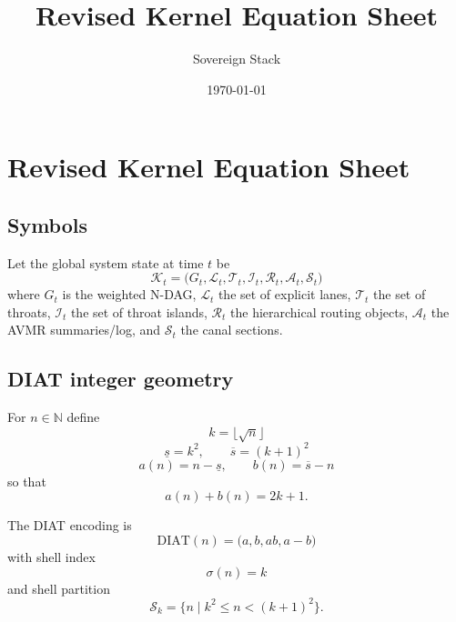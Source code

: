 \documentclass[11pt,a4paper]{article}
\title{Revised Kernel Equation Sheet}
\author{Sovereign Stack}
\date{\today}
\begin{document}
\maketitle

\appendix
\section{Revised Kernel Equation Sheet}

\subsection{Symbols}

Let the global system state at time $t$ be
\begin{equation}
\mathcal{K}_t = \bigl(G_t,\mathcal{L}_t,\mathcal{T}_t,\mathcal{I}_t,\mathcal{R}_t,\mathcal{A}_t,\mathcal{S}_t\bigr)
\label{eq:global_state}
\end{equation}
where $G_t$ is the weighted N-DAG, $\mathcal{L}_t$ the set of explicit lanes, $\mathcal{T}_t$ the set of throats, $\mathcal{I}_t$ the set of throat islands, $\mathcal{R}_t$ the hierarchical routing objects, $\mathcal{A}_t$ the AVMR summaries/log, and $\mathcal{S}_t$ the canal sections.

\subsection{DIAT integer geometry}

For $n\in\mathbb{N}$ define
\begin{equation}
k = \lfloor \sqrt{n} \rfloor
\label{eq:k_floor}
\end{equation}
\begin{equation}
\underline{s} = k^2,
\qquad
\overline{s} = (k+1)^2
\label{eq:squares}
\end{equation}
\begin{equation}
a(n)=n-\underline{s},
\qquad
b(n)=\overline{s}-n
\label{eq:a_b}
\end{equation}
so that
\begin{equation}
a(n)+b(n)=2k+1.
\label{eq:a_plus_b}
\end{equation}

The DIAT encoding is
\begin{equation}
\mathrm{DIAT}(n)=\bigl(a,b,ab,a-b\bigr)
\label{eq:diat}
\end{equation}
with shell index
\begin{equation}
\sigma(n)=k
\label{eq:shell_index}
\end{equation}
and shell partition
\begin{equation}
\mathcal{S}_k=\{n\mid k^2\le n<(k+1)^2\}.
\label{eq:shell_partition}
\end{equation}
\end{document}

